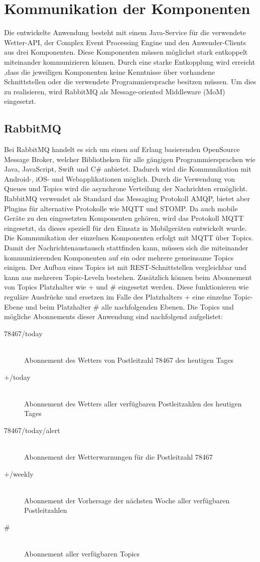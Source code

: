 \section{Kommunikation der Komponenten}
Die entwickelte Anwendung besteht mit einem Java-Service für die verwendete Wetter-API, der Complex Event Processing Engine und den Anwender-Clients aus drei Komponenten. Diese Komponenten müssen möglichst stark entkoppelt miteinander kommunizieren können. Durch eine starke Entkopplung wird erreicht ,dass die jeweiligen Komponenten keine Kenntnisse über vorhandene Schnittstellen oder die verwendete Programmiersprache besitzen müssen. Um dies zu realisieren, wird RabbitMQ als Message-oriented Middleware (MoM) eingesetzt. 
\subsection{RabbitMQ}\label{rabbitmq}
Bei RabbitMQ handelt es sich um einen auf Erlang basierenden OpenSource Message Broker, welcher Bibliotheken für alle gängigen Programmiersprachen wie Java, JavaScript, Swift und C\# anbietet. Dadurch wird die Kommunikation mit Android-, iOS- und Webapplikationen möglich. Durch die Verwendung von Queues und Topics wird die asynchrone Verteilung der Nachrichten ermöglicht. RabbitMQ verwendet als Standard das Messaging Protokoll AMQP, bietet aber Plugins für alternative Protokolle wie MQTT und STOMP. Da auch mobile Geräte zu den eingesetzten Komponenten gehören, wird das Protokoll MQTT eingesetzt, da dieses speziell für den Einsatz in Mobilgeräten entwickelt wurde. Die Kommunikation der einzelnen Komponenten erfolgt mit MQTT über Topics. Damit der Nachrichtenaustausch stattfinden kann, müssen sich die miteinander kommunizierenden Komponenten auf ein oder mehrere gemeinsame Topics einigen. Der Aufbau eines Topics ist mit REST-Schnittstellen vergleichbar und kann aus mehreren Topic-Leveln bestehen. Zusätzlich können beim Abonnement von Topics Platzhalter wie $+$ und \# eingesetzt werden. Diese funktionieren wie reguläre Ausdrücke und ersetzen im Falle des Platzhalters + eine einzelne Topic-Ebene und beim Platzhalter \# alle nachfolgenden Ebenen. Die Topics und mögliche Abonnements dieser Anwendung sind nachfolgend aufgelistet:
\begin{description}
\item[78467/today]\hfill \\ Abonnement des Wetters von Postleitzahl 78467 des heutigen Tages
\item[$+$/today]\hfill \\ Abonnement des Wetters aller verfügbaren Postleitzahlen des heutigen Tages
\item[78467/today/alert]\hfill \\ Abonnement der Wetterwarnungen für die Postleitzahl 78467
\item[$+$/weekly]\hfill \\ Abonnement der Vorhersage der nächsten Woche aller verfügbaren Postleitzahlen
\item[\#]\hfill \\ Abonnement aller verfügbaren Topics
\end{description}
